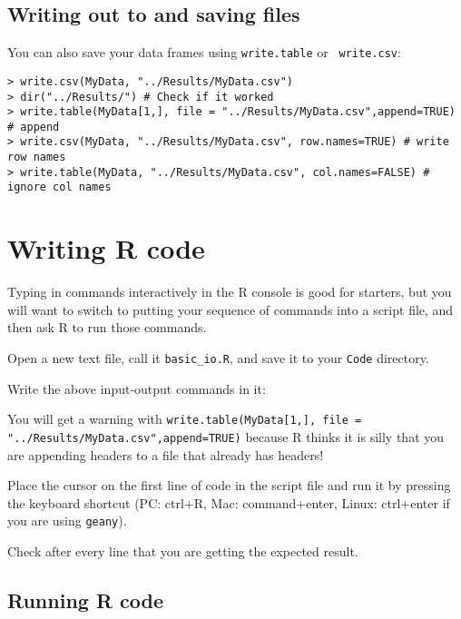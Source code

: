 \subsection{Writing out to and saving files}

You can also save your data frames using {\tt write.table} or {\tt 
write.csv}:

\begin{lstlisting}
> write.csv(MyData, "../Results/MyData.csv")
> dir("../Results/") # Check if it worked
> write.table(MyData[1,], file = "../Results/MyData.csv",append=TRUE) # append
> write.csv(MyData, "../Results/MyData.csv", row.names=TRUE) # write row names
> write.table(MyData, "../Results/MyData.csv", col.names=FALSE) # ignore col names
\end{lstlisting}

\section{Writing R code}
 
Typing in commands interactively in the R console is good for starters, 
but you will want to switch to putting your sequence of commands into a 
script file, and then ask R to run those commands. 

\begin{compactitem}[$\quad\star$]
	\item Open a new text file, call it {\tt basic\_io.R}, and save it to 
	your {\tt Code} directory. 
	\item Write the above input-output commands in it: 
\end{compactitem}


You will get a warning with {\tt write.table(MyData[1,], file = 
"../Results/MyData.csv",append=TRUE)} because R thinks it is silly that 
you are appending headers to a file that already has headers!

\begin{compactitem}[$\quad\star$]
	\item Place the cursor on the first line of code in the script file 
	and run it by pressing the keyboard shortcut (PC: ctrl+R, Mac: 
	command+enter, Linux: ctrl+enter if you are using {\tt geany}).
	\item Check after every line that you are getting the expected result.
\end{compactitem}

\subsection{Running R code}

